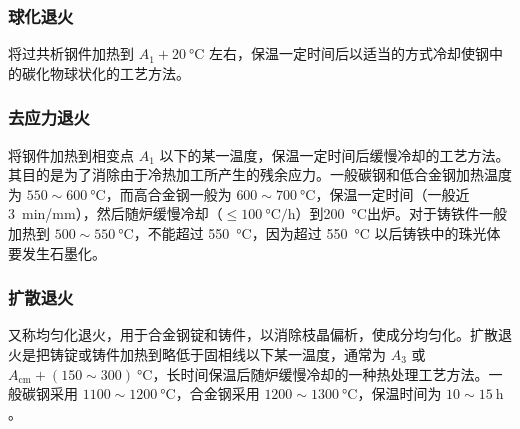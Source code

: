         \subsubsection{球化退火}
            将过共析钢件加热到 $A_1+20~\unit{\degreeCelsius}$ 左右，保温一定时间后以适当的方式冷却使钢中的碳化物球状化的工艺方法。
        \subsubsection{去应力退火}
            将钢件加热到相变点 $A_1$ 以下的某一温度，保温一定时间后缓慢冷却的工艺方法。其目的是为了消除由于冷热加工所产生的残余应力。一般碳钢和低合金钢加热温度为 $550 \sim 600~\unit{\degreeCelsius}$，而高合金钢一般为 $600 \sim 700~\unit{\degreeCelsius}$，保温一定时间（一般近 \SI{3}{\minute/\milli\metre}），然后随炉缓慢冷却（$\le \SI{100}{\degreeCelsius/\hour}$）到\SI{200}{\degreeCelsius}出炉。对于铸铁件一般加热到 $500 \sim 550~\unit{\degreeCelsius}$，不能超过 \SI{550}{\degreeCelsius}，因为超过 \SI{550}{\degreeCelsius} 以后铸铁中的珠光体要发生石墨化。
        \subsubsection{扩散退火}
            又称均匀化退火，用于合金钢锭和铸件，以消除枝晶偏析，使成分均匀化。扩散退火是把铸锭或铸件加热到略低于固相线以下某一温度，通常为 $A_3$ 或 $A_{\textrm{cm}} + (150 \sim 300)~\unit{\degreeCelsius}$，长时间保温后随炉缓慢冷却的一种热处理工艺方法。一般碳钢采用 $1100 \sim 1200~\unit{\degreeCelsius}$，合金钢采用 $1200 \sim 1300~\unit{\degreeCelsius}$，保温时间为 $10 \sim 15~\unit{\hour}$。
